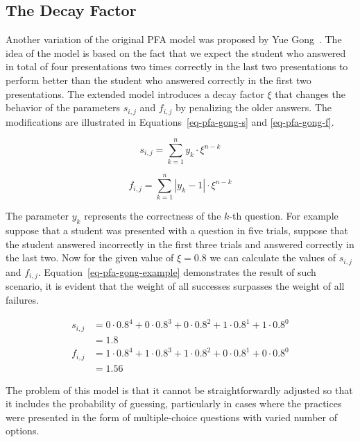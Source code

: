 \subsection*{The Decay Factor}
\label{pfag}

Another variation of the original PFA model was proposed by Yue Gong~\cite{Gong2011}. The idea of the model is based on the fact that we expect the student who answered in total of four presentations two times correctly in the last two presentations to perform better than the student who answered correctly in the first two presentations. The extended model introduces a decay factor $\xi$ that changes the behavior of the parameters $s_{i,j}$ and $f_{i,j}$ by penalizing the older answers. The modifications are illustrated in Equations~\ref{eq-pfa-gong-s} and \ref{eq-pfa-gong-f}.

\begin{equation} \label{eq-pfa-gong-s}
  s_{i,j} = \sum_{k=1}^{n} y_k \cdot \xi^{n-k}
\end{equation}

\begin{equation} \label{eq-pfa-gong-f}
  f_{i,j} = \sum_{k=1}^{n} |y_k - 1| \cdot \xi^{n-k}
\end{equation}

The parameter $y_k$ represents the correctness of the $k$-th question. For example suppose that a student was presented with a question in five trials, suppose that the student answered incorrectly in the first three trials and answered correctly in the last two. Now for the given value of $\xi = 0.8$ we can calculate the values of $s_{i,j}$ and $f_{i,j}$. Equation~\ref{eq-pfa-gong-example} demonstrates the result of such scenario, it is evident that the weight of all successes surpasses the weight of all failures. 

\begin{equation} \label{eq-pfa-gong-example}
  \begin{split}
  s_{i,j} & = 0 \cdot 0.8^4 + 0 \cdot 0.8^3 + 0 \cdot 0.8^2 + 1 \cdot 0.8^1 + 1 \cdot 0.8^0 \\
  & = 1.8 \\
  f_{i,j} & = 1 \cdot 0.8^4 + 1 \cdot 0.8^3 + 1 \cdot 0.8^2 + 0 \cdot 0.8^1 + 0 \cdot 0.8^0 \\
  & = 1.56
  \end{split}
\end{equation}

The problem of this model is that it cannot be straightforwardly adjusted so that it includes the probability of guessing, particularly in cases where the practices were presented in the form of multiple-choice questions with varied number of options.

